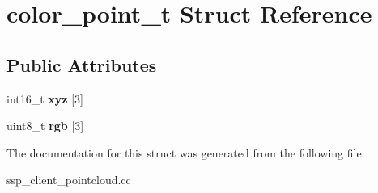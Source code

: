 \hypertarget{structcolor__point__t}{}\section{color\+\_\+point\+\_\+t Struct Reference}
\label{structcolor__point__t}
\subsection*{Public Attributes}
\begin{DoxyCompactItemize}
\item 
\mbox{\label{structcolor__point__t_a80c73fff2dbdfd9acac6f27ff61edb02}} 
int16\+\_\+t {\bfseries xyz} \mbox{[}3\mbox{]}
\item 
\mbox{\label{structcolor__point__t_a071a248cc724c15050210e69b9c5fa37}} 
uint8\+\_\+t {\bfseries rgb} \mbox{[}3\mbox{]}
\end{DoxyCompactItemize}


The documentation for this struct was generated from the following file\+:\begin{DoxyCompactItemize}
\item 
ssp\+\_\+client\+\_\+pointcloud.\+cc\end{DoxyCompactItemize}
